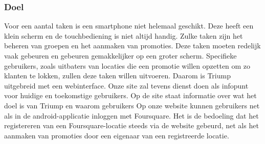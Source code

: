 \subsubsection{Doel}
Voor een aantal taken is een smartphone niet helemaal geschikt. Deze heeft een klein scherm en de touchbediening is niet altijd handig. Zulke taken zijn het beheren van groepen en het aanmaken van promoties.
Deze taken moeten redelijk vaak gebeuren en gebeuren gemakkelijker op een groter scherm. Specifieke gebruikers, zoals uitbaters van locaties die een promotie willen opzetten om zo klanten te lokken, zullen deze taken willen uitvoeren. Daarom is Triump uitgebreid met een webinterface.
Onze site zal tevens dienst doen als infopunt voor huidige en toekomstige gebruikers. Op de site staat informatie over wat het doel is van Triump en waarom gebruikers
Op onze website kunnen gebruikers net als in de android-applicatie inloggen met Foursquare. Het is de bedoeling dat het registereren van een Foursquare-locatie steeds via de website gebeurd, net als het aanmaken van promoties door een eigenaar van een registreerde locatie.
